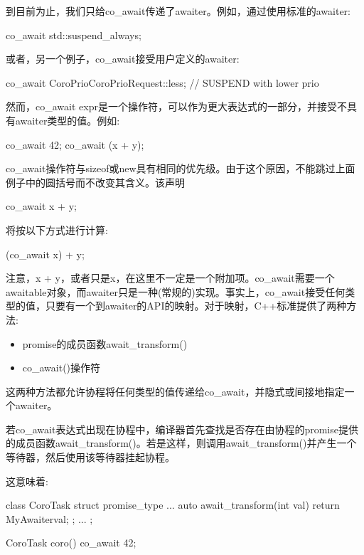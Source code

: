 
到目前为止，我们只给co\_await传递了awaiter。例如，通过使用标准的awaiter:

\begin{cpp}
co_await std::suspend_always{};
\end{cpp}

或者，另一个例子，co\_await接受用户定义的awaiter:

\begin{cpp}
co_await CoroPrio{CoroPrioRequest::less}; // SUSPEND with lower prio
\end{cpp}

然而，co\_await expr是一个操作符，可以作为更大表达式的一部分，并接受不具有awaiter类型的值。例如:

\begin{cpp}
co_await 42;
co_await (x + y);
\end{cpp}

co\_await操作符与sizeof或new具有相同的优先级。由于这个原因，不能跳过上面例子中的圆括号而不改变其含义。该声明

\begin{cpp}
co_await x + y;
\end{cpp}

将按以下方式进行计算:

\begin{cpp}
(co_await x) + y;
\end{cpp}

注意，x + y，或者只是x，在这里不一定是一个附加项。co\_await需要一个awaitable对象，而awaiter只是一种(常规的)实现。事实上，co\_await接受任何类型的值，只要有一个到awaiter的API的映射。对于映射，C++标准提供了两种方法:

\begin{itemize}
\item
promise的成员函数await\_transform()

\item
co\_await()操作符
\end{itemize}

这两种方法都允许协程将任何类型的值传递给co\_await，并隐式或间接地指定一个awaiter。



若co\_await表达式出现在协程中，编译器首先查找是否存在由协程的promise提供的成员函数await\_transform()。若是这样，则调用await\_transform()并产生一个等待器，然后使用该等待器挂起协程。

这意味着:

\begin{cpp}
class CoroTask {
	struct promise_type {
		...
		auto await_transform(int val) {
			return MyAwaiter{val};
		}
	};
	...
};

CoroTask coro()
{
	co_await 42;
}
\end{cpp}

